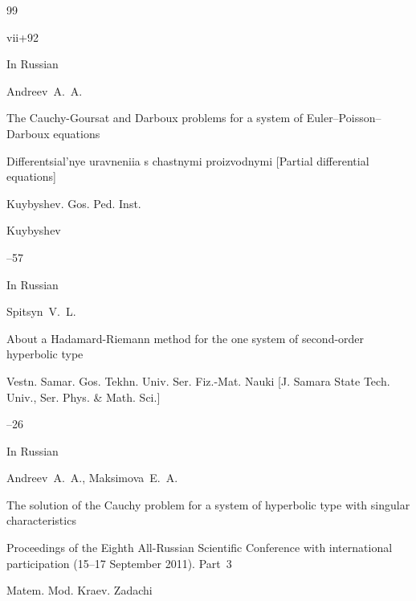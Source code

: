 \begin{thebibliography}{99}

\totalpages vii+92







\lang In Russian

\by Andreev~A.~A.

\paper The Cauchy-Goursat and Darboux problems for a system of Euler--Poisson--Darboux equations

\inbook Differentsial'nye uravneniia s chastnymi proizvodnymi \rm [Partial differential equations]

\publ Kuybyshev. Gos. Ped. Inst.

\publaddr Kuybyshev


--57







\lang In Russian

\by Spitsyn~V.~L.

\paper About a Hadamard-Riemann method for the one system of second-order hyperbolic type

\jour  Vestn. Samar. Gos. Tekhn. Univ. Ser. Fiz.-Mat. Nauki \rm [J. Samara State Tech. Univ., Ser. Phys. \& Math. Sci.]



--26











\lang In Russian

\by Andreev~A.~A., Maksimova~E.~A.

\paper The solution of the Cauchy problem for a system of hyperbolic type with singular characteristics

\inbook Proceedings of the Eighth All-Russian Scientific Conference with international participation \rm (15--17 September 2011). Part~3

\serial Matem. Mod. Kraev. Zadachi



\end{thebibliography}
